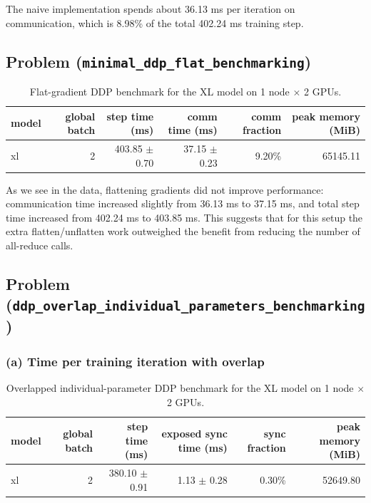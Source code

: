 \documentclass[11pt]{article}
\begin{document}
The naive implementation spends about 36.13 ms per iteration on communication, which is 8.98\% of the total 402.24 ms training step.


\subsection{Problem (\texttt{minimal\_ddp\_flat\_benchmarking})}

\begin{table}[H]
\centering
\caption{Flat-gradient DDP benchmark for the XL model on 1 node $\times$ 2 GPUs.}
\begin{tabular}{lrrrrr}
\toprule
model & global batch & step time (ms) & comm time (ms) & comm fraction & peak memory (MiB) \\
\midrule
xl & 2 & 403.85 $\pm$ 0.70 & 37.15 $\pm$ 0.23 & 9.20\% & 65145.11 \\
\bottomrule
\end{tabular}
\end{table}

As we see in the data, flattening gradients did not improve performance: communication time increased slightly from 36.13 ms to 37.15 ms, and total step time increased from 402.24 ms to 403.85 ms. This suggests that for this setup the extra flatten/unflatten work outweighed the benefit from reducing the number of all-reduce calls.


\subsection{Problem (\texttt{ddp\_overlap\_individual\_parameters\_benchmarking})}

\subsubsection*{(a) Time per training iteration with overlap}

\begin{table}[H]
\centering
\caption{Overlapped individual-parameter DDP benchmark for the XL model on 1 node $\times$ 2 GPUs.}
\begin{tabular}{lrrrrr}
\toprule
model & global batch & step time (ms) & exposed sync time (ms) & sync fraction & peak memory (MiB) \\
\midrule
xl & 2 & 380.10 $\pm$ 0.91 & 1.13 $\pm$ 0.28 & 0.30\% & 52649.80 \\
\bottomrule
\end{tabular}
\end{table}
\end{document}
